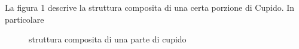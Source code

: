 
La figura 1 descrive la struttura composita di una certa porzione di Cupido. In particolare 


\begin{center}
  \begin{figure}[ht]
    \begin{center}
    \end{center}
    \caption{struttura composita di una parte di cupido}
    \label{fig:example}
  \end{figure}
\end{center}